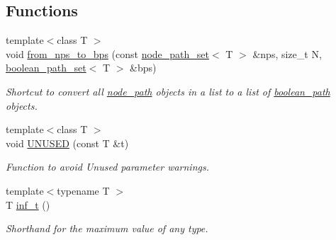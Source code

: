 \subsection*{Functions}
\begin{DoxyCompactItemize}
\item 
{\footnotesize template$<$class T $>$ }\\void \hyperlink{namespacelgraph_1_1utils_ab15212bece1e1a0f3a8f98b26f2a33c8}{from\+\_\+nps\+\_\+to\+\_\+bps} (const \hyperlink{namespacelgraph_1_1utils_a723c115f9865edfab11a90377b9abef4}{node\+\_\+path\+\_\+set}$<$ T $>$ \&nps, size\+\_\+t N, \hyperlink{namespacelgraph_1_1utils_aaf50131e15d771a45620336d6e7a77f8}{boolean\+\_\+path\+\_\+set}$<$ T $>$ \&bps)
\begin{DoxyCompactList}\small\item\em Shortcut to convert all \hyperlink{classlgraph_1_1utils_1_1node__path}{node\+\_\+path} objects in a list to a list of \hyperlink{classlgraph_1_1utils_1_1boolean__path}{boolean\+\_\+path} objects. \end{DoxyCompactList}\item 
{\footnotesize template$<$class T $>$ }\\void \hyperlink{namespacelgraph_1_1utils_a02e9a521f6566b3bd3570cfec6d19db1}{U\+N\+U\+S\+ED} (const T \&t)\hypertarget{namespacelgraph_1_1utils_a02e9a521f6566b3bd3570cfec6d19db1}{}\label{namespacelgraph_1_1utils_a02e9a521f6566b3bd3570cfec6d19db1}

\begin{DoxyCompactList}\small\item\em Function to avoid \textquotesingle{}Unused parameter\textquotesingle{} warnings. \end{DoxyCompactList}\item 
{\footnotesize template$<$typename T $>$ }\\T \hyperlink{namespacelgraph_1_1utils_af61dd7000b978d1a5d6ba67166f7da35}{inf\+\_\+t} ()\hypertarget{namespacelgraph_1_1utils_af61dd7000b978d1a5d6ba67166f7da35}{}\label{namespacelgraph_1_1utils_af61dd7000b978d1a5d6ba67166f7da35}

\begin{DoxyCompactList}\small\item\em Shorthand for the maximum value of any type. \end{DoxyCompactList}\end{DoxyCompactItemize}
